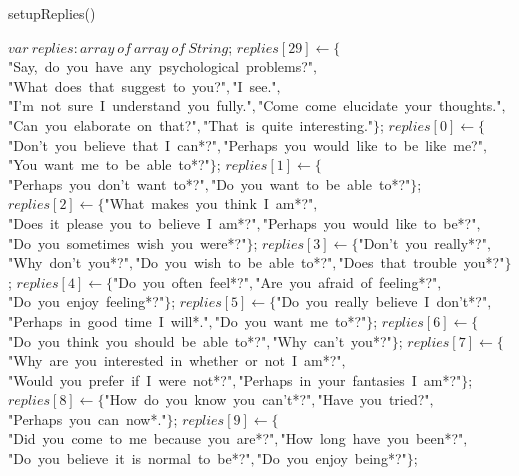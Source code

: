 \documentclass[a4paper,10pt]{article}
\begin{document}
\begin{algorithm}
\caption{setupReplies()}
\begin{algorithmic}[5]

\STATE {}
\STATE {}
\STATE {}
  \STATE \(var\ replies:array\ of\ array\ of\ String\);
  \STATE {}
  \STATE {}
  \STATE \(replies[29]\gets\{\)"{}Say,\ do\ you\ have\ any\ psychological\ problems?"{}\(,\)"{}What\ does\ that\ suggest\ to\ you?"{}\(,\)"{}I\ see."{}\(,\)"{}I'{}m\ not\ sure\ I\ understand\ you\ fully."{}\(,\)"{}Come\ come\ elucidate\ your\ thoughts."{}\(,\)"{}Can\ you\ elaborate\ on\ that?"{}\(,\)"{}That\ is\ quite\ interesting."{}\(\}\);
  \STATE \(replies[0]\gets\{\)"{}Don'{}t\ you\ believe\ that\ I\ can*?"{}\(,\)"{}Perhaps\ you\ would\ like\ to\ be\ like\ me?"{}\(,\)"{}You\ want\ me\ to\ be\ able\ to*?"{}\(\}\);
  \STATE \(replies[1]\gets\{\)"{}Perhaps\ you\ don'{}t\ want\ to*?"{}\(,\)"{}Do\ you\ want\ to\ be\ able\ to*?"{}\(\}\);
  \STATE \(replies[2]\gets\{\)"{}What\ makes\ you\ think\ I\ am*?"{}\(,\)"{}Does\ it\ please\ you\ to\ believe\ I\ am*?"{}\(,\)"{}Perhaps\ you\ would\ like\ to\ be*?"{}\(,\)"{}Do\ you\ sometimes\ wish\ you\ were*?"{}\(\}\);
  \STATE \(replies[3]\gets\{\)"{}Don'{}t\ you\ really*?"{}\(,\)"{}Why\ don'{}t\ you*?"{}\(,\)"{}Do\ you\ wish\ to\ be\ able\ to*?"{}\(,\)"{}Does\ that\ trouble\ you*?"{}\(\}\);
  \STATE \(replies[4]\gets\{\)"{}Do\ you\ often\ feel*?"{}\(,\)"{}Are\ you\ afraid\ of\ feeling*?"{}\(,\)"{}Do\ you\ enjoy\ feeling*?"{}\(\}\);
  \STATE \(replies[5]\gets\{\)"{}Do\ you\ really\ believe\ I\ don'{}t*?"{}\(,\)"{}Perhaps\ in\ good\ time\ I\ will*."{}\(,\)"{}Do\ you\ want\ me\ to*?"{}\(\}\);
  \STATE \(replies[6]\gets\{\)"{}Do\ you\ think\ you\ should\ be\ able\ to*?"{}\(,\)"{}Why\ can'{}t\ you*?"{}\(\}\);
  \STATE \(replies[7]\gets\{\)"{}Why\ are\ you\ interested\ in\ whether\ or\ not\ I\ am*?"{}\(,\)"{}Would\ you\ prefer\ if\ I\ were\ not*?"{}\(,\)"{}Perhaps\ in\ your\ fantasies\ I\ am*?"{}\(\}\);
  \STATE \(replies[8]\gets\{\)"{}How\ do\ you\ know\ you\ can'{}t*?"{}\(,\)"{}Have\ you\ tried?"{}\(,\)"{}Perhaps\ you\ can\ now*."{}\(\}\);
  \STATE \(replies[9]\gets\{\)"{}Did\ you\ come\ to\ me\ because\ you\ are*?"{}\(,\)"{}How\ long\ have\ you\ been*?"{}\(,\)"{}Do\ you\ believe\ it\ is\ normal\ to\ be*?"{}\(,\)"{}Do\ you\ enjoy\ being*?"{}\(\}\);

\end{algorithmic}
\end{algorithm}
\end{document}

